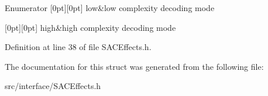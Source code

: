 \begin{DoxyEnumFields}{Enumerator}
[0pt][0pt]{}\mbox{\label{struct_decoding_type_a8b3854652406458753c9b7da2068b822a1c83062a65b39a734cfb6393fa679425}} 
low&low complexity decoding mode \\
\hline

[0pt][0pt]{}\mbox{\label{struct_decoding_type_a8b3854652406458753c9b7da2068b822a6184aedf8f82a070f5c054ead79d4d30}} 
high&high complexity decoding mode \\
\hline

\end{DoxyEnumFields}


Definition at line 38 of file S\+A\+C\+Effects.\+h.



The documentation for this struct was generated from the following file\+:\begin{DoxyCompactItemize}
\item 
src/interface/S\+A\+C\+Effects.\+h\end{DoxyCompactItemize}
